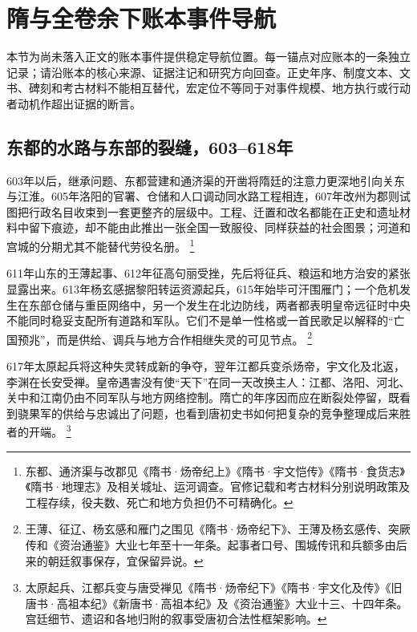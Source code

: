 \section{隋与全卷余下账本事件导航}
\label{sec:event-anchors-final-0}
本节为尚未落入正文的账本事件提供稳定导航位置。每一锚点对应账本的一条独立记录；请沿账本的核心来源、证据注记和研究方向回查。正史年序、制度文本、文书、碑刻和考古材料不能相互替代，宏定位不等同于对事件规模、地方执行或行动者动机作超出证据的断言。

\subsection{东都的水路与东部的裂缝，603--618年}

603年以后，继承问题、东都营建和通济渠的开凿将隋廷的注意力更深地引向关东与江淮。605年洛阳的官署、仓储和人口调动同水路工程相连，607年改州为郡则试图把行政名目收束到一套更整齐的层级中。工程、迁置和改名都能在正史和遗址材料中留下痕迹，却不能由此推出一张全国一致服役、同样获益的社会图景；河道和宫城的分期尤其不能替代劳役名册。%
\footnote{东都、通济渠与改郡见《隋书·炀帝纪上》《隋书·宇文恺传》《隋书·食货志》《隋书·地理志》及相关城址、运河调查。官修记载和考古材料分别说明政策及工程存续，役夫数、死亡和地方负担仍不可精确化。}

611年山东的王薄起事、612年征高句丽受挫，先后将征兵、粮运和地方治安的紧张显露出来。613年杨玄感据黎阳转运资源起兵，615年始毕可汗围雁门；一个危机发生在东部仓储与重臣网络中，另一个发生在北边防线，两者都表明皇帝远征时中央不能同时稳妥支配所有道路和军队。它们不是单一性格或一首民歌足以解释的“亡国预兆”，而是供给、调兵与地方合作相继失灵的可见节点。%
\footnote{王薄、征辽、杨玄感和雁门之围见《隋书·炀帝纪下》、王薄及杨玄感传、突厥传和《资治通鉴》大业七年至十一年条。起事者口号、围城传讯和兵额多由后来的朝廷叙事保存，宜保留异说。}

617年太原起兵将这种失灵转成新的争夺，翌年江都兵变杀炀帝，宇文化及北返，李渊在长安受禅。皇帝遇害没有使“天下”在同一天改换主人：江都、洛阳、河北、关中和江南仍由不同军队与地方网络控制。隋亡的年序因而应在断裂处停留，既看到骁果军的供给与忠诚出了问题，也看到唐初史书如何把复杂的竞争整理成后来胜者的开端。%
\footnote{太原起兵、江都兵变与唐受禅见《隋书·炀帝纪下》《隋书·宇文化及传》《旧唐书·高祖本纪》《新唐书·高祖本纪》及《资治通鉴》大业十三、十四年条。宫廷细节、遗诏和各地归附的叙事受唐初合法性框架影响。}

